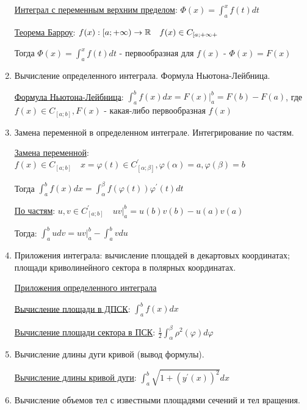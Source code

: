 \documentclass[12pt]{article}
\begin{document}
\begin{enumerate}
        \hyperlink{integralwithvariableupperlimit}{Интеграл с переменным верхним пределом}: $\Phi(x) = \int^x_a f(t) dt$

        \hyperlink{theorembarrow}{Теорема Барроу}: $f(x) : [a;+\infty) \to \mathbb{R} \quad f(x) \in C_{[a;+\infty+}$

        Тогда $\Phi(x) = \int^x_a f(t) dt$ - первообразная для $f(x)$ - $\Phi(x) = F(x)$


        \item Вычисление определенного интеграла. Формула Ньютона-Лейбница.

        \hyperlink{formulanewtonleibniz}{Формула Ньютона-Лейбница}: $\int^b_a f(x)dx = F(x) \Big|^b_a = F(b) - F(a)$, где $f(x) \in C_{[a;b]}, F(x)$ - какая-либо первообразная $f(x)$

        \item Замена переменной в определенном интеграле. Интегрирование по частям.

        \hyperlink{integralsubstitution}{Замена переменной}: $f(x) \in C_{[a;b]} \quad x = \varphi(t) \in C^\prime_{[\alpha;\beta]}, \varphi(\alpha) = a, \varphi(\beta) = b$

        Тогда $\int^b_a f(x)dx = \int^\beta_\alpha f(\varphi(t)) \varphi^\prime(t) dt$

        \hyperlink{integralbyparts}{По частям}: $u, v \in C^\prime_{[a;b]} \quad uv \Big|_a^b = u(b)v(b) - u(a)v(a)$

        Тогда: $\int^b_a udv = uv \Big|_a^b - \int^b_a vdu$


        \item Приложения интеграла: вычисление площадей в декартовых координатах; площади криволинейного сектора в полярных координатах.

        \hyperlink{integralapplications}{Приложения определенного интеграла}

        \hyperlink{integralareadpsk}{Вычисление площади в ДПСК}: $\int_a^b f(x) dx$

        \hyperlink{integralareapsk}{Вычисление площади сектора в ПСК}: $\frac{1}{2} \int_\alpha^\beta \rho^2(\varphi) d\varphi$


        \item Вычисление длины дуги кривой (вывод формулы).

        \hyperlink{lengthofarc}{Вычисление длины кривой дуги}: $\int_a^b \sqrt{1 + (y^\prime(x))^2} dx$

        \item Вычисление объемов тел с известными площадями сечений и тел вращения.


\end{enumerate}
\end{document}
